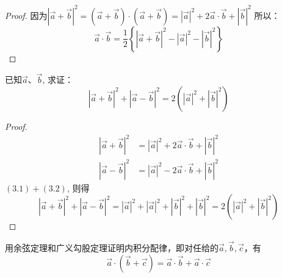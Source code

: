 \begin{proof}
因为$\left|\vec{a}+\vec{b}\right|^2=\left(\vec{a}+\vec{b}\right)\cdot \left(\vec{a}+\vec{b}\right)=\left|\vec{a}\right|^2+2\vec{a}\cdot \vec{b}+\left|\vec{b}\right|^2$
所以：
\[\vec{a}\cdot\vec{b} =\frac{1}{2}\left\{\left|\vec{a}+\vec{b}\right|^2-\left|\vec{a}\right|^2-\left|\vec{b}\right|^2\right\}\]
\end{proof}

\begin{example}
    已知$\vec{a}$、$\vec{b}$, 求证：
\[\left|\vec{a}+\vec{b}\right|^2+\left|\vec{a}-\vec{b}\right|^2=2\left(|\vec{a}|^2+\left|\vec{b}\right|^2\right)\]
\end{example}

\begin{proof}
\begin{align}
    \left|\vec{a}+\vec{b}\right|^2&=\left|\vec{a}\right|^2+2\vec{a}\cdot \vec{b}+\left|\vec{b}\right|^2\\
    \left|\vec{a}-\vec{b}\right|^2&=\left|\vec{a}\right|^2-2\vec{a}\cdot \vec{b}+\left|\vec{b}\right|^2
\end{align}
$(3.1)+(3.2)$, 则得
\[\left|\vec{a}+\vec{b}\right|^2+\left|\vec{a}-\vec{b}\right|^2=\left|\vec{a}\right|^2+\left|\vec{a}\right|^2+\left|\vec{b}\right|^2+\left|\vec{b}\right|^2=  2\left(|\vec{a}|^2+\left|\vec{b}\right|^2\right)\]
\end{proof}

\begin{example}
    用余弦定理和广义勾股定理证明内积分配律，即对任给的$\vec{a},\vec{b},\vec{c}$，有
\[\vec{a}\cdot \left(\vec{b}+\vec{c}\right)=\vec{a}\cdot \vec{b}+\vec{a}\cdot \vec{c}\]
\end{example}


